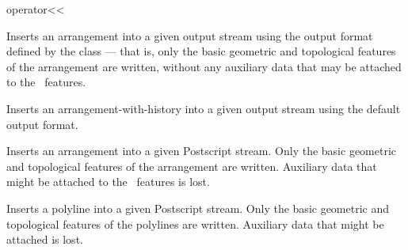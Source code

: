 \ccHtmlNoClassLinks
\begin{ccRefFunction}{operator<<}
\label{ref_arr_operator_leftshift}

\ccDefinition


Inserts an arrangement into a given output stream using the
output format defined by the  class --- that is,
only the basic geometric and topological features of the arrangement are
written, without any auxiliary data that may be attached to the
\dcel\ features.




Inserts an arrangement-with-history into a given
output stream using the default output format.




Inserts an arrangement into a given Postscript stream.
Only the basic geometric and topological features of the arrangement are
written. Auxiliary data that might be attached to the \dcel\ features is
lost.




Inserts a polyline into a given Postscript stream.
Only the basic geometric and topological features of the polylines are
written. Auxiliary data that might be attached is lost.
    



\end{ccRefFunction}

